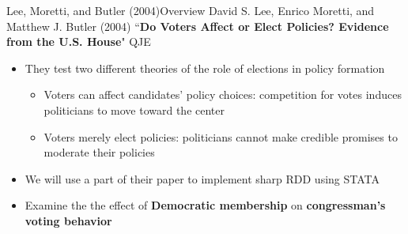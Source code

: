 \documentclass[hyperref={pdfpagelabels=false}]{beamer}
\begin{document}
\begin{frame}{Lee, Moretti, and Butler (2004)}{Overview}
	David S. Lee, Enrico Moretti, and Matthew J. Butler (2004) ``\textbf{Do Voters Affect or Elect Policies? Evidence from the U.S. House}" QJE
	\vspace{0.2cm}
	\begin{itemize}
		
		\item They test two different theories of the role of elections in policy formation
		\vspace{0.2cm}
			\begin{itemize}
		\item[1] Voters can affect candidates' policy choices: competition for votes induces politicians to
		move toward the center
		\vspace{0.2cm}
		\item[2] Voters merely elect policies: politicians cannot make credible promises to moderate their policies
		\vspace{0.2cm}
			\end{itemize}
		\item We will use a part of their paper to implement sharp RDD using STATA
		\vspace{0.2cm}
		\item Examine the the effect of \textbf{Democratic membership} on \textbf{congressman's voting behavior} 
		
		
		
	\end{itemize}
\end{frame}
\end{document}
